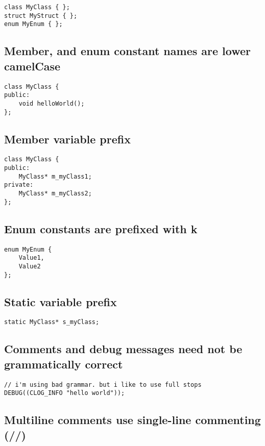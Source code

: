 \documentclass{article}
\begin{document}
\begin{verbatim}
class MyClass { };
struct MyStruct { };
enum MyEnum { };
\end{verbatim}

\subsection{Member, and enum constant names are lower camelCase}

\begin{verbatim}
class MyClass {
public:
    void helloWorld();
};
\end{verbatim}

\subsection{Member variable prefix}

\begin{verbatim}
class MyClass {
public:
    MyClass* m_myClass1;
private:
    MyClass* m_myClass2;
};
\end{verbatim}

\subsection{Enum constants are prefixed with k}

\begin{verbatim}
enum MyEnum {
    Value1,
    Value2
};
\end{verbatim}

\subsection{Static variable prefix}

\begin{verbatim}
static MyClass* s_myClass;
\end{verbatim}

\subsection{Comments and debug messages need not be grammatically correct}

\begin{verbatim}
// i'm using bad grammar. but i like to use full stops
DEBUG((CLOG_INFO "hello world"));
\end{verbatim}

\subsection{Multiline comments use single-line commenting (//)}
\end{document}

